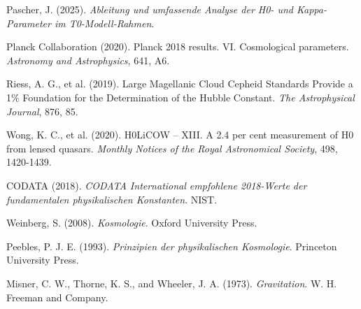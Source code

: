 \documentclass[12pt,a4paper]{article}
\begin{document}
	\begin{thebibliography}{9}
		
		Pascher, J. (2025). \textit{Ableitung und umfassende Analyse der H0- und Kappa-Parameter im T0-Modell-Rahmen}.
		
		Planck Collaboration (2020). Planck 2018 results. VI. Cosmological parameters. \textit{Astronomy and Astrophysics}, 641, A6.
		
		Riess, A. G., et al. (2019). Large Magellanic Cloud Cepheid Standards Provide a 1\% Foundation for the Determination of the Hubble Constant. \textit{The Astrophysical Journal}, 876, 85.
		
		Wong, K. C., et al. (2020). H0LiCOW -- XIII. A 2.4 per cent measurement of H0 from lensed quasars. \textit{Monthly Notices of the Royal Astronomical Society}, 498, 1420-1439.
		
		CODATA (2018). \textit{CODATA International empfohlene 2018-Werte der fundamentalen physikalischen Konstanten}. NIST.
		
		Weinberg, S. (2008). \textit{Kosmologie}. Oxford University Press.
		
		Peebles, P. J. E. (1993). \textit{Prinzipien der physikalischen Kosmologie}. Princeton University Press.
		
		Misner, C. W., Thorne, K. S., and Wheeler, J. A. (1973). \textit{Gravitation}. W. H. Freeman and Company.
		
	\end{thebibliography}
	
\end{document}

